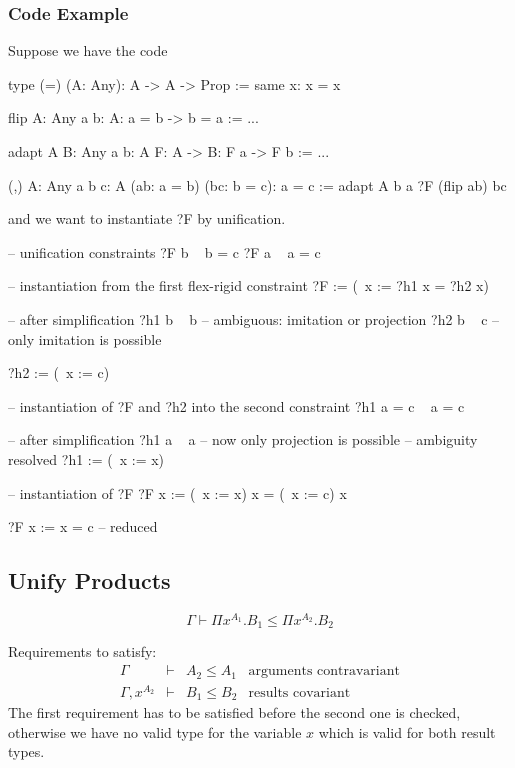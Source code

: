 \subsubsection{Code Example}

Suppose we have the code
\begin{alba}
    type (=) (A: Any): A -> A -> Prop :=
        same {x}: x = x

    flip {A: Any} {a b: A}: a = b -> b = a :=
        ...

    adapt {A B: Any} {a b: A} {F: A -> B}: F a -> F b :=
        ...

    (,) {A: Any} {a b c: A} (ab: a = b) (bc: b = c): a = c :=
        adapt {A} {b} {a} {?F} (flip ab) bc
\end{alba}
%
and we want to instantiate ?F by unification.

\begin{alba}
    -- unification constraints
    ?F b   ~   b = c
    ?F a   ~   a = c

    -- instantiation from the first flex-rigid constraint
    ?F := (\ x := ?h1 x = ?h2 x)

    -- after simplification
    ?h1 b  ~  b             -- ambiguous: imitation or projection
    ?h2 b  ~  c             -- only imitation is possible

    ?h2 := (\ x := c)

    -- instantiation of ?F and ?h2 into the second constraint
    ?h1 a = c    ~    a = c

    -- after simplification
    ?h1 a  ~  a             -- now only projection is possible
                            -- ambiguity resolved
    ?h1 := (\ x := x)

    -- instantiation of ?F
    ?F x := (\ x := x) x = (\ x := c) x

    ?F x := x = c   -- reduced
\end{alba}






\subsection{Unify Products}

$$
    \Gamma \vdash \Pi x^{A_1}. B_1 \le \Pi x^{A_2}. B_2
$$

Requirements to satisfy:
$$
\begin{array}{llll}
    \Gamma &\vdash&
    A_2 \le A_1
    &\text{arguments contravariant}
    \\
    \Gamma, x^{A_2} &\vdash&
    B_1 \le B_2
    &\text{results covariant}
\end{array}
$$
The first requirement has to be satisfied before the second one is checked,
otherwise we have no valid type for the variable $x$ which is valid for both
result types.

